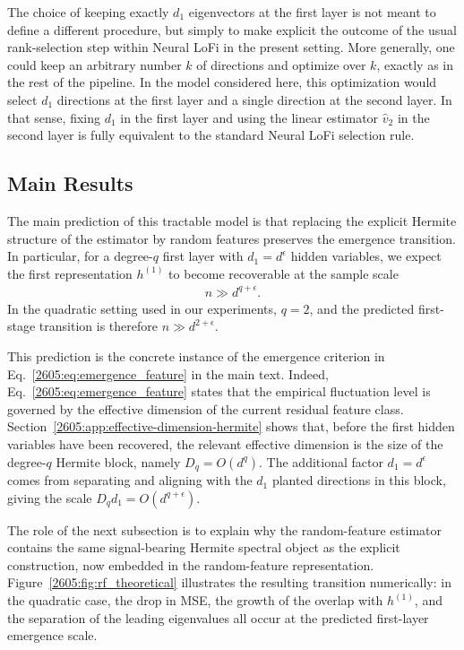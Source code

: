 The choice of keeping exactly \(d_1\) eigenvectors at the first layer is not meant to define a different procedure, but simply to make explicit the outcome of the usual rank-selection step within Neural LoFi in the present setting. More generally, one could keep an arbitrary number \(k\) of directions and optimize over \(k\), exactly as in the rest of the pipeline. In the model considered here, this optimization would select \(d_1\) directions at the first layer and a single direction at the second layer. In that sense, fixing \(d_1\) in the first layer and using the linear estimator \(\widehat v_2\) in the second layer is fully equivalent to the standard Neural LoFi selection rule.


\subsection{Main Results}\label{2605:subsec:th_main_results}

The main prediction of this tractable model is that replacing the explicit Hermite structure of the estimator by random features preserves the emergence transition. In particular, for a degree-$q$ first layer with $d_1=d^\epsilon$ hidden variables, we expect the first representation $h^{(1)}$ to become recoverable at the sample scale
\begin{align}
    n
    \gg
    d^{q+\epsilon}.
\end{align}
In the quadratic setting used in our experiments, $q=2$, and the predicted first-stage transition is therefore $n \gg d^{2+\epsilon}$.

This prediction is the concrete instance of the emergence criterion in Eq.~\eqref{2605:eq:emergence_feature} in the main text. Indeed, Eq.~\eqref{2605:eq:emergence_feature} states that the empirical fluctuation level is governed by the effective dimension of the current residual feature class. Section~\ref{2605:app:effective-dimension-hermite} shows that, before the first hidden variables have been recovered, the relevant effective dimension is the size of the degree-$q$ Hermite block, namely $D_q=O(d^q)$. The additional factor $d_1=d^\epsilon$ comes from separating and aligning with the $d_1$ planted directions in this block, giving the scale $D_qd_1=O(d^{q+\epsilon})$.

The role of the next subsection is to explain why the random-feature estimator contains the same signal-bearing Hermite spectral object as the explicit construction, now embedded in the random-feature representation. Figure~\ref{2605:fig:rf_theoretical} illustrates the resulting transition numerically: in the quadratic case, the drop in MSE, the growth of the overlap with $h^{(1)}$, and the separation of the leading eigenvalues all occur at the predicted first-layer emergence scale.



